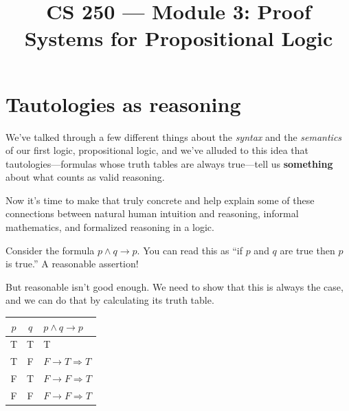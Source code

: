\documentclass[11pt]{article}
\title{CS 250 --- Module 3: Proof Systems for Propositional Logic}
\author{}
\date{}
\begin{document}
\maketitle

\begin{readingmap}



\end{readingmap}

\section{Tautologies as reasoning}

We've talked through a few different things about the \emph{syntax} and the \emph{semantics} of our first logic, propositional logic, and we've alluded to this idea that tautologies---formulas whose truth tables are always true---tell us \textbf{something} about what counts as valid reasoning.

Now it's time to make that truly concrete and help explain some of these connections between natural human intuition and reasoning, informal mathematics, and formalized reasoning in a logic.

Consider the formula $p \wedge q \to p$. You can read this as ``if $p$ and $q$ are true then $p$ is true.'' A reasonable assertion!

But reasonable isn't good enough. We need to show that this is always the case, and we can do that by calculating its truth table.

\begin{center}
\begin{tabular}{ccl}
\toprule
$p$ & $q$ & $p \wedge q \to p$ \\
\midrule
T & T & T \\
T & F & $F \to T \Longrightarrow T$ \\
F & T & $F \to F \Longrightarrow T$ \\
F & F & $F \to F \Longrightarrow T$ \\
\bottomrule
\end{tabular}
\end{center}
\end{document}
